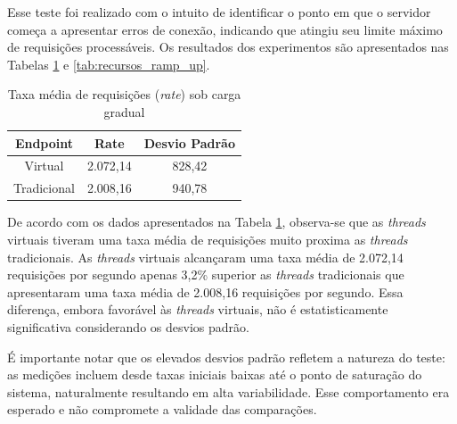 \documentclass[12pt, openright, oneside, a4paper, english,	french,	spanish, brazil	]{abntex2}
\begin{document}
Esse teste foi realizado com o intuito de identificar o ponto em que o servidor começa a apresentar erros de conexão, indicando que atingiu seu limite máximo de requisições processáveis. Os resultados dos experimentos são apresentados nas Tabelas \ref{tab:rate_ramp_up} e \ref{tab:recursos_ramp_up}.

\begin{table}[H]
    \centering
    \caption{\footnotesize Taxa  média de requisições (\textit{rate}) sob carga gradual}
    \label{tab:rate_ramp_up}
    \footnotesize
    \renewcommand{\arraystretch}{1.15}
    \setlength{\tabcolsep}{6pt}
    \begin{tabular}{ccc}
        \toprule
        \textbf{Endpoint} &
        \textbf{Rate} &
        \textbf{Desvio Padrão} \\
        \midrule
        Virtual       & 2.072,14 & 828,42   \\
        Tradicional         & 2.008,16 & 940,78   \\
        \bottomrule
    \end{tabular}
\end{table}


De acordo com os dados apresentados na Tabela \ref{tab:rate_ramp_up}, observa-se que as \textit{threads} virtuais tiveram uma taxa média de requisições muito proxima as \textit{threads} tradicionais. As \textit{threads} virtuais alcançaram uma taxa média de 2.072,14 requisições por segundo apenas 3,2\% superior as \textit{threads} tradicionais que apresentaram uma taxa média de 2.008,16 requisições por segundo. Essa diferença, embora favorável às \textit{threads} virtuais, não é estatisticamente significativa considerando os desvios padrão.

É importante notar que os elevados desvios padrão refletem a natureza do teste: as medições incluem desde taxas iniciais baixas até o ponto de saturação do sistema, naturalmente resultando em alta variabilidade. Esse comportamento era esperado e não compromete a validade das comparações.
\end{document}
